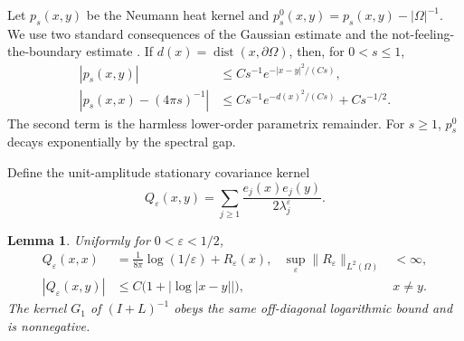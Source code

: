 \documentclass[11pt]{article}
\newtheorem{lemma}{Lemma}
\newcommand{\Om}{\Omega}
\begin{document}
Let $p_s(x,y)$ be the Neumann heat kernel and
$p_s^0(x,y)=p_s(x,y)-|\Om|^{-1}$.  We use two standard consequences of the
Gaussian estimate and the not-feeling-the-boundary estimate
\cite{LiStrohmaier}.  If $d(x)=\operatorname{dist}(x,\partial\Om)$, then,
for $0<s\leq1$,
\begin{align}
 |p_s(x,y)|&\leq Cs^{-1}e^{-|x-y|^2/(Cs)},\label{eq:gauss}\\
 \left|p_s(x,x)-(4\pi s)^{-1}\right|
 &\leq Cs^{-1}e^{-d(x)^2/(Cs)}+Cs^{-1/2}.\label{eq:nfb}
\end{align}
The second term is the harmless lower-order parametrix remainder.  For
$s\geq1$, $p_s^0$ decays exponentially by the spectral gap.

Define the unit-amplitude stationary covariance kernel
\begin{equation}\label{eq:Qdef}
 Q_\varepsilon(x,y)
 =\sum_{j\geq1}\frac{e_j(x)e_j(y)}{2\lambda_j^\varepsilon}.
\end{equation}

\begin{lemma}\label{lem:heat}
Uniformly for $0<\varepsilon<1/2$,
\begin{align}
 Q_\varepsilon(x,x)
 &=\frac{1}{8\pi}\log(1/\varepsilon)+R_\varepsilon(x),
 &\sup_\varepsilon\|R_\varepsilon\|_{L^2(\Om)}&<\infty,
 \label{eq:diag}\\
 |Q_\varepsilon(x,y)|
 &\leq C\bigl(1+|\log|x-y||\bigr),&&x\neq y.
 \label{eq:offdiag}
\end{align}
The kernel $G_1$ of $(I+L)^{-1}$ obeys the same off-diagonal logarithmic
bound and is nonnegative.
\end{lemma}
\end{document}
